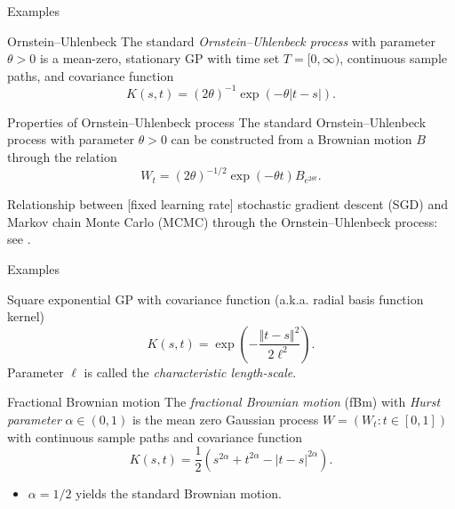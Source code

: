 \begin{frame}{Examples}

\begin{exampleblock}{Ornstein--Uhlenbeck}
	The standard \textit{Ornstein--Uhlenbeck process} with parameter $\theta>0$ is a mean-zero, stationary GP with time set $T = [0, \infty)$, continuous sample paths, and covariance function
		$$K(s,t) = (2\theta)^{-1}\exp\left(-\theta|t-s|\right).$$
\end{exampleblock}

\pause

\begin{alertblock}{Properties of Ornstein--Uhlenbeck process}
	The standard Ornstein--Uhlenbeck process with parameter $\theta>0$ can be constructed from a Brownian motion $B$ through the relation 	
	$$W_t = (2\theta)^{-1/2}\exp\left(-\theta t\right)B_{e^{2\theta t}}.$$
\end{alertblock}

\pause

Relationship between [fixed learning rate] \alert{stochastic gradient descent} (SGD) and \alert{Markov chain Monte Carlo} (MCMC) through the Ornstein--Uhlenbeck process: see \citet{mandt2017stochastic}.


\end{frame}


\begin{frame}{Examples}

	
\begin{exampleblock}{Square exponential}
	GP with covariance function (a.k.a. radial basis function kernel)
	$$K(s,t) = \exp\left(-\frac{\Vert t-s\Vert^2}{2\ell^2}\right).$$
	Parameter $\ell$ is called the \textit{characteristic length-scale}.
\end{exampleblock}


\begin{exampleblock}{Fractional Brownian motion}
	The \textit{fractional Brownian motion} (fBm) with \textit{Hurst parameter} $\alpha\in  (0, 1)$ is the mean zero Gaussian process $ W = (W_t : t \in  [0, 1])$ with continuous sample paths and covariance function
	$$K(s,t) = \frac{1}{2}\left(s^{2\alpha}+t^{2\alpha}-|t-s|^{2\alpha}\right).$$
	\begin{itemize}
		\item $\alpha=1/2$ yields the standard Brownian motion.
	\end{itemize}
\end{exampleblock}
	
\end{frame}


